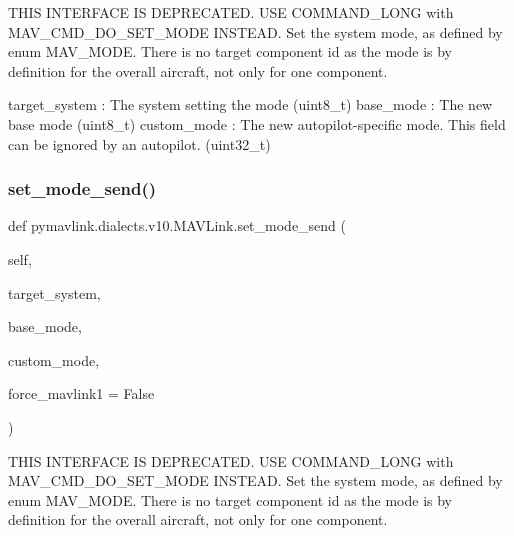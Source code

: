 \begin{DoxyVerb}
\begin{DoxyVerb}
\begin{DoxyVerb}
\begin{DoxyVerb}
\begin{DoxyVerb}
\begin{DoxyVerb}
\begin{DoxyVerb}
\begin{DoxyVerb}
\begin{DoxyVerb}
\begin{DoxyVerb}
\begin{DoxyVerb}THIS INTERFACE IS DEPRECATED. USE COMMAND_LONG with
MAV_CMD_DO_SET_MODE INSTEAD. Set the system mode, as
defined by enum MAV_MODE. There is no target component
id as the mode is by definition for the overall
aircraft, not only for one component.

target_system             : The system setting the mode (uint8_t)
base_mode                 : The new base mode (uint8_t)
custom_mode               : The new autopilot-specific mode. This field can be ignored by an autopilot. (uint32_t)\end{DoxyVerb}
 \mbox{\label{classpymavlink_1_1dialects_1_1v10_1_1MAVLink_a8c39cfe5b1f4cd429e93a213d52597d0}} 
\subsubsection{\texorpdfstring{set\+\_\+mode\+\_\+send()}{set\_mode\_send()}}
{\footnotesize\ttfamily def pymavlink.\+dialects.\+v10.\+M\+A\+V\+Link.\+set\+\_\+mode\+\_\+send (\begin{DoxyParamCaption}\item[{}]{self,  }\item[{}]{target\+\_\+system,  }\item[{}]{base\+\_\+mode,  }\item[{}]{custom\+\_\+mode,  }\item[{}]{force\+\_\+mavlink1 = {\ttfamily False} }\end{DoxyParamCaption})}

\begin{DoxyVerb}THIS INTERFACE IS DEPRECATED. USE COMMAND_LONG with
MAV_CMD_DO_SET_MODE INSTEAD. Set the system mode, as
defined by enum MAV_MODE. There is no target component
id as the mode is by definition for the overall
aircraft, not only for one component.


\end{DoxyVerb}
\end{DoxyVerb}
\end{DoxyVerb}
\end{DoxyVerb}
\end{DoxyVerb}
\end{DoxyVerb}
\end{DoxyVerb}
\end{DoxyVerb}
\end{DoxyVerb}
\end{DoxyVerb}
\end{DoxyVerb}
